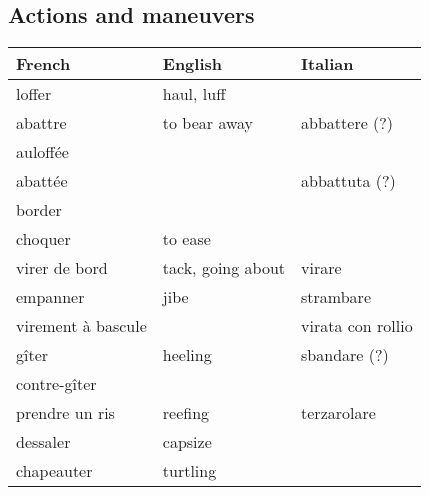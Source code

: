\documentclass[a4paper, 12pt, twoside]{article}
\begin{document}
    \begin{indt}{\section{Actions and maneuvers}} %
        \begin{tabular}{|l|l|l|}
            \hline %
            \textbf{French}
            & \textbf{English}
            & \textbf{Italian}
            \\
            \hline
            \hline %
            loffer %
            & haul, luff
            &
            \\
            \hline %
            abattre %
            & to bear away
            & abbattere (?)
            \\
            \hline %
            auloffée  %
            &
            &
            \\
            \hline %
            abattée %
            &
            & abbattuta (?)
            \\
            \hline %
            border %
            &
            &
            \\
            \hline %
            choquer %
            & to ease
            &
            \\
            \hline %
            virer de bord %
            & tack, going about
            & virare
            \\
            \hline %
            empanner %
            & jibe
            & strambare
            \\
            \hline %
            virement à bascule %
            &
            & virata con rollio
            \\
            \hline %
            gîter %
            & heeling
            & sbandare (?)
            \\
            \hline %
            contre-gîter %
            &
            &
            \\
            \hline %
            prendre un ris %
            & reefing
            & terzarolare
            \\
            \hline %
            dessaler %
            & capsize
            &
            \\
            \hline %
            chapeauter %
            & turtling 
            &
            \\

\end{tabular}
\end{indt}
\end{document}
